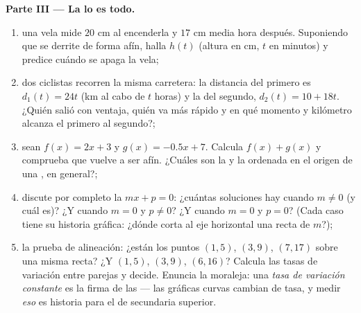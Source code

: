 \begin{problem}
\medskip
\noindent\textbf{Parte III --- La  lo es todo.}
\begin{enumerate}[resume]
  \item una vela mide $20$ cm al encenderla y $17$ cm media
        hora después. Suponiendo que se derrite de forma afín, halla $h(t)$ (altura
        en cm, $t$ en minutos) y predice cuándo se apaga la vela;
  \item dos ciclistas recorren la misma carretera: la distancia del primero es
        $d_1(t) = 24t$ (km al cabo de $t$ horas) y la del segundo,
        $d_2(t) = 10 + 18t$. ¿Quién salió con ventaja, quién
        va más rápido y en qué momento y kilómetro alcanza el
        primero al segundo?;
  \item sean $f(x) = 2x + 3$ y $g(x) = -0.5x + 7$. Calcula
        $f(x) + g(x)$ y comprueba que vuelve a ser afín. ¿Cuáles son la
         y la ordenada en el origen de una , en general?;
  \item discute por completo la  $mx + p = 0$: ¿cuántas
        soluciones hay cuando $m \neq 0$ (y cuál es)? ¿Y cuando $m = 0$
        y $p \neq 0$? ¿Y cuando $m = 0$ y $p = 0$? (Cada caso
        tiene su historia gráfica: ¿dónde corta al eje horizontal una recta
        de  $m$?);
  \item la prueba de alineación: ¿están los puntos $(1, 5)$, $(3, 9)$,
        $(7, 17)$ sobre una misma recta? ¿Y $(1, 5)$, $(3, 9)$,
        $(6, 16)$? Calcula las tasas de variación entre parejas y
        decide. Enuncia la moraleja: una \emph{tasa de variación
        constante} es la firma de las  --- las gráficas
        curvas cambian de tasa, y medir \emph{eso} es
        historia para el  de secundaria superior.
\end{enumerate}
\end{problem}
